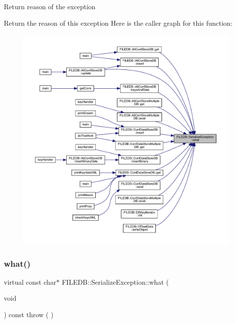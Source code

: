 Return reason of the exception

Return the reason of this exception Here is the caller graph for this function\+:
\nopagebreak
\begin{figure}[H]
\begin{center}
\leavevmode
\includegraphics[width=350pt]{d3/d5a/classFILEDB_1_1SerializeException_a71ecca567a36c3b247d936b5e98e4707_icgraph}
\end{center}
\end{figure}
\mbox{\label{classFILEDB_1_1SerializeException_a1c143c27480a4c2d85f20a19b3061add}} 
\subsubsection{\texorpdfstring{what()}{what()}\hspace{0.1cm}{\footnotesize\ttfamily [3/3]}}
{\footnotesize\ttfamily virtual const char$\ast$ F\+I\+L\+E\+D\+B\+::\+Serialize\+Exception\+::what (\begin{DoxyParamCaption}\item[{void}]{ }\end{DoxyParamCaption}) const throw ( ) \hspace{0.3cm}{\ttfamily [virtual]}}

